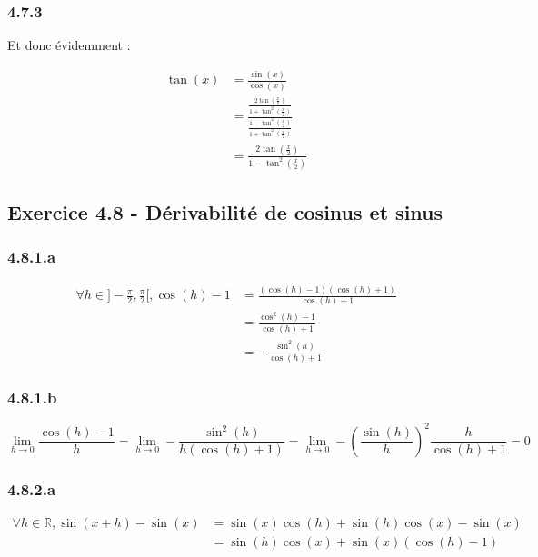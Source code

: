 \documentclass[a4paper,10pt]{report}
\begin{document}
\subsubsection*{4.7.3}

Et donc évidemment :

\begin{equation*}
	\begin{split}
		\tan (x) 
		&= \frac{\sin(x)}{\cos(x)} \\
		&= \frac{\frac{2 \tan(\frac{x}{2})}{1 + \tan^2(\frac{x}{2})}}{\frac{1 - \tan^2(\frac{x}{2})}{1 + \tan^2(\frac{x}{2})}} \\
		&= \frac{2 \tan(\frac{x}{2})}{1 - \tan^2(\frac{x}{2})}
	\end{split}
\end{equation*}

\subsection*{Exercice 4.8 - Dérivabilité de cosinus et sinus}

\subsubsection*{4.8.1.a}
\begin{equation*}
	\begin{split}
		\forall h \in ]-\frac{\pi}{2} , \frac{\pi}{2}[, \cos(h) - 1
			&= \frac{(\cos(h) - 1)(\cos(h) + 1)}{\cos(h) + 1} \\
			&= \frac{\cos^2(h) - 1}{\cos(h) + 1} \\
			&= -\frac{\sin^2(h)}{\cos(h) + 1}
	\end{split}
\end{equation*}

\subsubsection*{4.8.1.b}
\begin{displaymath}
	\lim_{h \rightarrow 0} \frac{\cos(h) - 1}{h}
		= \lim_{h \rightarrow 0} -\frac{\sin^2(h)}{h(\cos(h) + 1)}
		= \lim_{h \rightarrow 0} -\left( \frac{\sin(h)}{h}\right)^2 \frac{h}{\cos(h) + 1} = 0
\end{displaymath}

\subsubsection*{4.8.2.a}
\begin{equation*}
	\begin{split}
		\forall h \in \mathbb{R} , \sin(x+h) -\sin(x)
			&= \sin(x)\cos(h) + \sin(h)\cos(x) -\sin(x) \\
			&= \sin(h)\cos(x) + \sin(x) (\cos(h) - 1)
	\end{split}
\end{equation*}
\end{document}
